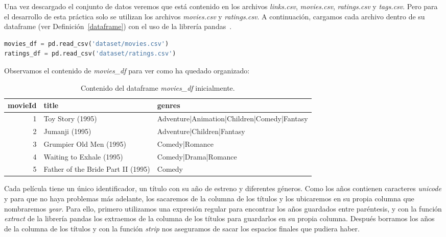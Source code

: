 \documentclass{uimppracticas}
\begin{document}
Una vez descargado el conjunto de datos veremos que está contenido en los archivos \textit{links.csv}, \textit{movies.csv}, \textit{ratings.csv} y \textit{tags.csv}. Pero para el desarrollo de esta práctica solo se utilizan los archivos \textit{movies.csv} y \textit{ratings.csv}. A continuación, cargamos cada archivo dentro de su dataframe (ver Definición~\ref{dataframe}) con el uso de la librería pandas~\cite{pandas}.

\begin{lstlisting}[language=python]
movies_df = pd.read_csv('dataset/movies.csv')
ratings_df = pd.read_csv('dataset/ratings.csv')
\end{lstlisting}

Observamos el contenido de \textit{movies\_df} para ver como ha quedado organizado:

\begin{table}[h]
	\centering
	\begin{tabular}{rll}
		\toprule
		movieId &                               title &                                       genres \\
		\midrule
		1 &                    Toy Story (1995) &  Adventure|Animation|Children|Comedy|Fantasy \\
		2 &                      Jumanji (1995) &                   Adventure|Children|Fantasy \\
		3 &             Grumpier Old Men (1995) &                               Comedy|Romance \\
		4 &            Waiting to Exhale (1995) &                         Comedy|Drama|Romance \\
		5 &  Father of the Bride Part II (1995) &                                       Comedy \\
		\bottomrule
	\end{tabular}
	\caption{Contenido del dataframe \textit{movies\_df} inicialmente.}
	\label{movies_df}
\end{table}

Cada película tiene un único identificador, un título con su año de estreno y diferentes géneros. Como los años contienen caracteres \textit{unicode} y para que no haya problemas más adelante, los sacaremos de la columna de los títulos y los ubicaremos en su propia columna que nombraremos \textit{year}. Para ello, primero utilizamos una expresión regular para encontrar los años guardados entre paréntesis, y con la función \textit{extract} de la librería pandas los extraemos de la columna de los títulos para guardarlos en su propia columna. Después borramos los años de la columna de los títulos y con la función \textit{strip} nos aseguramos de sacar los espacios finales que pudiera haber.
\end{document}
